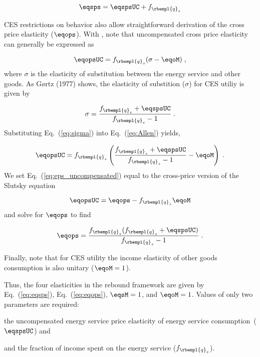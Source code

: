 \begin{equation} \label{eq:eqsps}
  \eqsps = \eqspsUC + f_{\rbempl{q}_s}
\end{equation}

CES restrictions on behavior also allow straightforward derivation 
of the cross price elasticity ($\eqops$).
With \citet{Hicks1934}, 
note that uncompensated cross price elasticity can generally be expressed as

\begin{equation} \label{eq:Allen}
  \eqopsUC = f_{\rbempl{q}_s} (\sigma - \eqoM) \; ,
\end{equation}
%
where $\sigma$ is the elasticity of substitution 
between the energy service and other goods.
As G{\o}rtz (1977) shows, the elasticity 
of substition ($\sigma$) for CES utiliy is given by

\begin{equation} \label{eq:sigma}
  \sigma  = \frac{f_{\rbempl{q}_s} + \eqspsUC}{f_{\rbempl{q}_s} -1 } \; .
\end{equation}
%
Substituting Eq.~(\ref{eq:sigma}) into Eq.~(\ref{eq:Allen}) yields, 

\begin{equation} \label{eq:eps_uncompensated}
  \eqopsUC = f_{\rbempl{q}_s} \left( \frac{f_{\rbempl{q}_s} + \eqspsUC}{f_{\rbempl{q}_s} -1 } - \eqoM \right) \; .
\end{equation}
%
We set Eq.~(\ref{eq:eps_uncompensated}) equal to 
the cross-price version of the Slutsky equation

\begin{equation}
  \eqopsUC = \eqops - f_{\rbempl{q}_s} \eqoM
\end{equation}
%
and solve for $\eqops$ to find

\begin{equation} \label{eq:eqops}
  \eqops = \frac{f_{\rbempl{q}_s} (f_{\rbempl{q}_s} + \eqspsUC)}{f_{\rbempl{q}_s}-1} \; .
\end{equation}

Finally, note that for CES utility the income elasticity of other goods consumption
is also unitary ($\eqoM = 1$). 

Thus, the four elasticities in the rebound framework are given by
Eq.~(\ref{eq:eqsps}), 
Eq.~(\ref{eq:eqops}), 
$\eqsM = 1$, and 
$\eqoM = 1$.
Values of only two parameters are required:
%
\begin{enumerate*}[label={(\alph*)}]
	
  \item the uncompensated energy service price elasticity of energy service consumption~($\eqspsUC$) and
  
  \item and the fraction of income spent on the energy service ($f_{\rbempl{q}_s}$).
    
\end{enumerate*}

